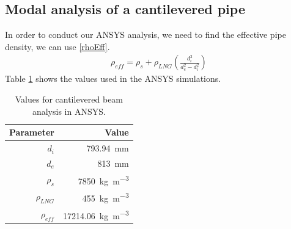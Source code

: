\subsection{Modal analysis of a cantilevered pipe}
In order to conduct our ANSYS analysis, we need to find the effective pipe density, we can use \eqref{rhoEff}.
\begin{gather}\label{rhoEff}
    \rho_{eff} = \rho_s + \rho_{LNG}\left(\frac{d_i^2}{d_e^2 - d_i^2}\right)
\end{gather}
Table \ref{modalParams} shows the values used in the ANSYS simulations.
\begin{table}[H]
    \centering
    \begin{tabular}{@{}rr@{}}
        \toprule
        \textbf{Parameter} & \textbf{Value}                            \\
        \midrule
        $d_i$              & \SI{793.94}{\milli\meter}                 \\
        $d_e$              & \SI{813}{\milli\meter}                    \\
        $\rho_s$           & \SI{7850}{\kilo\gram\per\meter\cubed}     \\
        $\rho_{LNG}$       & \SI{455}{\kilo\gram\per\meter\cubed}      \\
        $\rho_{eff}$       & \SI{17214.06}{\kilo\gram\per\meter\cubed} \\
        \bottomrule
    \end{tabular}
    \caption{Values for cantilevered beam analysis in ANSYS.}
    \label{modalParams}
\end{table}
